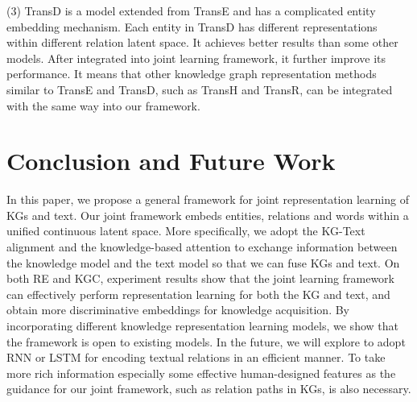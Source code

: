 \documentclass[letterpaper]{article} %
\begin{document}
(3) TransD is a model extended from TransE and has a complicated entity embedding mechanism. Each entity in TransD has different representations within different relation latent space. It achieves better results than some other models. After integrated into joint learning framework, it further improve its performance. It means that other knowledge graph representation methods similar to TransE and TransD, such as TransH and TransR, can be integrated with the same way into our framework.











\section{Conclusion and Future Work}

In this paper, we propose a general framework for joint representation learning of KGs and text. Our joint framework embeds entities, relations and words within a unified continuous latent space. More specifically, we adopt the KG-Text alignment and the knowledge-based attention to exchange information between the knowledge model and the text model so that we can fuse KGs and text. On both RE and KGC, experiment results show that the joint learning framework can effectively perform representation learning for both the KG and text, and obtain more discriminative embeddings for knowledge acquisition. By incorporating different knowledge representation learning models, we show that the framework is open to existing models. In the future, we will explore to adopt RNN or LSTM for encoding textual relations in an efficient manner. To take more rich information especially some effective human-designed features as the guidance for our joint framework, such as relation paths in KGs, is also necessary.



\end{document}

